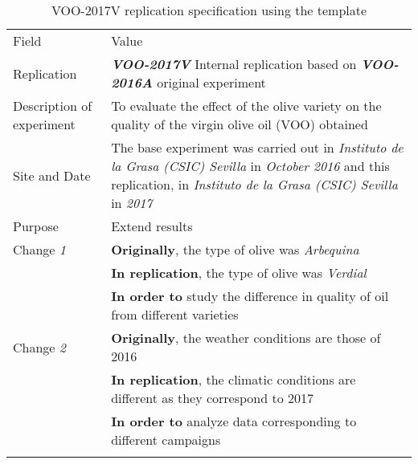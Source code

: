 \begin{table*}[h]
  \caption{VOO-2017V replication specification using the template}
\label{tab:edi}
  \centering

\begin{tabularx}{\textwidth}{
  >{\hsize=0.25\hsize}X
  >{\hsize=0.8\hsize}X}
  
    \noalign{\smallskip}\hline\noalign{\smallskip}
  
  Field &  Value  \\ 
  \noalign{\smallskip}\hline\noalign{\smallskip}
 
 Replication &   \textbf{\emph{VOO-2017V}}   Internal replication based on \textbf{\emph{VOO-2016A}}  original experiment   \\
     
 Description \newline of experiment &  To evaluate the effect of the olive variety on the quality of the virgin olive oil (VOO) obtained \\  
 
 Site and Date & The base experiment was carried out in  \textit{Instituto de la Grasa (CSIC) Sevilla}  in  \textit{October 2016} and this replication, in  \textit{Instituto de la Grasa (CSIC) Sevilla} in \textit{2017}    \\
    Purpose  &  Extend results \\  
\hline   
    Change \textit{1}   & \textbf{Originally}, the type of olive was \textit{Arbequina} \\& \textbf{In replication}, the type of olive was \textit{Verdial} \\& \textbf{In order to} study the difference in quality of oil from different varieties   \\
    
\hline      
     Change \textit{2}   & \textbf{Originally}, the weather conditions are those of 2016 \\& \textbf{In replication}, the climatic conditions are different as they correspond to 2017 \\& \textbf{In order to} analyze data corresponding to different campaigns  \\
    

    
   	\noalign{\smallskip\smallskip}\hline
	\end{tabularx}  
\end{table*}
